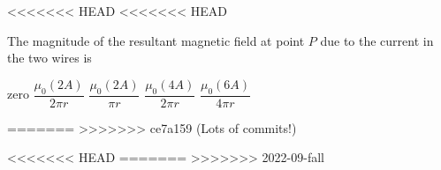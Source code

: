 \documentclass{../../oss-apphys-exam}
\begin{document}
\begin{multicols*}{2}
\begin{questions}
<<<<<<< HEAD
<<<<<<< HEAD
    
    \question The magnitude of the resultant magnetic field at point $P$ due to
    the current in the two wires is
    \begin{choices}
      \choice zero
      \choice$\dfrac{\mu_0(2A)}{2\pi r}$
      \choice$\dfrac{\mu_0(2A)}{\pi r}$
      \choice$\dfrac{\mu_0(4A)}{2\pi r}$
      \choice$\dfrac{\mu_0(6A)}{4\pi r}$
    \end{choices}
    \label{q:2wires2}
=======
%    
>>>>>>> ce7a159 (Lots of commits!)

<<<<<<< HEAD
=======
%    
>>>>>>> 2022-09-fall


\end{questions}
\end{multicols*}
\end{document}
